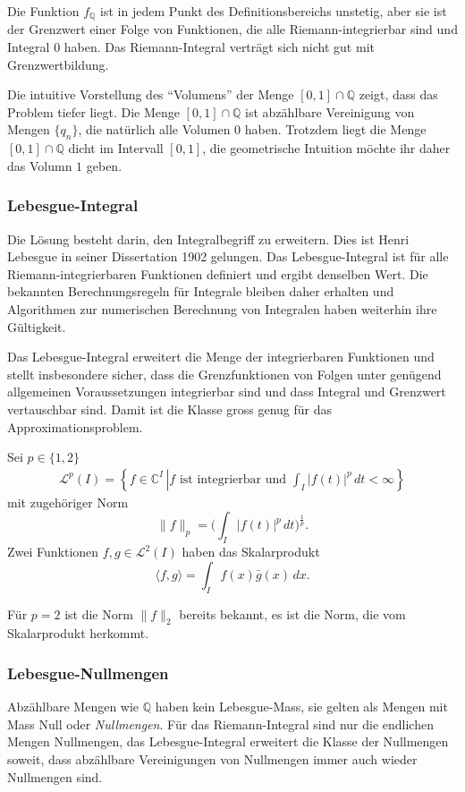 Die Funktion $f_{\mathbb{Q}}$ ist in jedem Punkt des Definitionsbereichs
unstetig, aber sie ist der Grenzwert einer Folge von Funktionen, die
alle Riemann-integrierbar sind und Integral $0$ haben.
Das Riemann-Integral verträgt sich nicht gut mit Grenzwertbildung.

Die intuitive Vorstellung des ``Volumens'' der Menge 
$[0,1]\cap\mathbb{Q}$ zeigt, dass das Problem tiefer liegt.
Die Menge $[0,1]\cap\mathbb{Q}$ ist abzählbare Vereinigung von Mengen $\{q_n\}$,
die natürlich alle Volumen $0$ haben.
Trotzdem liegt die Menge $[0,1]\cap\mathbb{Q}$ dicht im Intervall $[0,1]$,
die geometrische Intuition möchte ihr daher das Volumn $1$ geben.

\subsubsection{Lebesgue-Integral}
%
%
Die Lösung besteht darin, den Integralbegriff zu erweitern.
Dies ist Henri Lebesgue in seiner Dissertation 1902 gelungen.
Das Lebesgue-Integral ist für alle Riemann-integrierbaren Funktionen
definiert und ergibt denselben Wert.
Die bekannten Berechnungsregeln für Integrale bleiben daher erhalten
und Algorithmen zur numerischen Berechnung von Integralen haben
weiterhin ihre Gültigkeit.

Das Lebesgue-Integral erweitert die Menge der integrierbaren Funktionen
und stellt insbesondere sicher, dass die Grenzfunktionen von Folgen
unter genügend allgemeinen Voraussetzungen integrierbar sind und dass
Integral und Grenzwert vertauschbar sind.
Damit ist die Klasse gross genug für das Approximationsproblem.

\begin{definition}
Sei $p\in \{1,2\}$ 
\begin{align*}
\mathcal{L}^p(I)
=
\left\{ f \in \mathbb C^I \, \left|
\text{
$f$ ist integrierbar und $\int_I |f(t)|^p\,dt<\infty$
}
\right.\right\}
\end{align*}
mit zugehöriger Norm
\[
\|f\|_p = \biggl(\int_I |f(t)|^p \,dt\biggr)^{\frac1p}.
\]
Zwei Funktionen $f,g\in\mathcal{L}^2(I)$ haben das Skalarprodukt
\[
\langle f,g\rangle
=
\int_I f(x)\bar{g}(x)\,dx.
\]
\end{definition}

Für $p=2$ ist die Norm $\|f\|_2$ bereits bekannt, es ist die Norm, die
vom Skalarprodukt herkommt.

\subsubsection{Lebesgue-Nullmengen}
Abzählbare Mengen wie $\mathbb Q$ haben kein Lebesgue-Mass, sie
gelten als Mengen mit Mass Null oder {\em Nullmengen}.
%
Für das Riemann-Integral sind nur die endlichen Mengen Nullmengen,
das Lebesgue-Integral erweitert die Klasse der Nullmengen soweit,
dass abzählbare Vereinigungen von Nullmengen immer auch wieder
Nullmengen sind.

